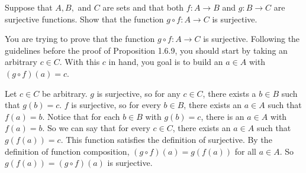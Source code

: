 \documentclass[12pt]{article}
\newenvironment{problem}[2][Problem]
{
	\begin{trivlist} 
		\item[\hskip \labelsep {\bfseries #1 #2:}]
	}
{
	\end{trivlist}
	}
\newenvironment{solution}[1][Solution]
{
	\begin{trivlist} 
		\item[\hskip \labelsep {\itshape #1:}]
	}
	{
	\end{trivlist}
}
\begin{document}
\begin{problem}{1}
\begin{solution}
\end{solution}
\end{problem}

\newpage
\begin{problem}{2}
	Suppose that $A, B,$ and $C$ are sets and that both $f:A \to B$ and $g:B \to C$ are surjective functions. Show that the function $g \circ f : A \to C$ is surjective.
	
	 You are trying to prove that the function $g \circ f : A \to C$ is surjective. Following the guidelines before the proof of Proposition 1.6.9, you should start by taking an arbitrary $c \in C$. With this $c$ in hand, you goal is to build an $a \in A$ with $(g \circ f)(a) = c$.
\begin{solution} %

Let $c \in C$ be arbitrary.
$g$ is surjective, so for any $c \in C$, there exists a $b \in B$ such that $g(b)=c$. $f$ is surjective, so for every $b \in B$, there exists an $a \in A$ such that $f(a)=b$. Notice that for each $b \in B$ with $g(b)=c$, there is an $a \in A$ with $f(a)=b$. So we can say that for every $c \in C$, there exists an $a \in A$ such that $g(f(a))=c$. This function satisfies the definition of surjective. By the definition of function composition, $(g \circ f)(a)=g(f(a))$ for all $a \in A$. So $g(f(a))=(g \circ f)(a)$ is surjective.
\end{solution}

\end{problem}
\end{document}
